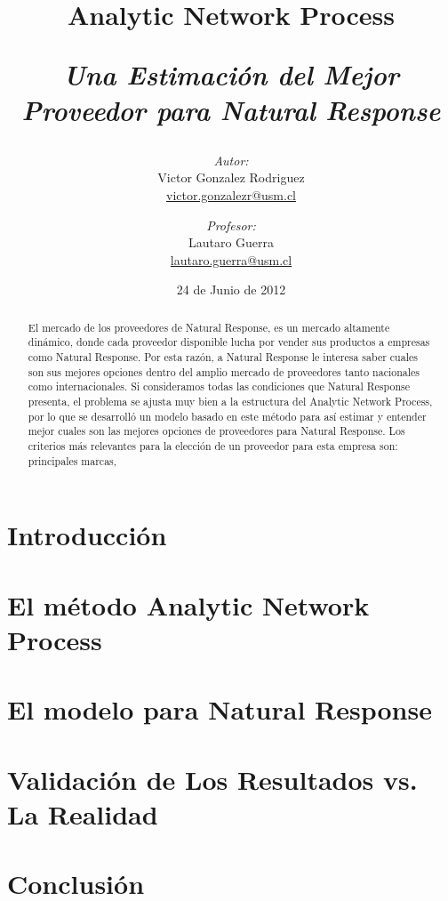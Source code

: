 \documentclass[12pt,letterpaper]{article}
\begin{document}
\title{Analytic Network Process \\ \begin{Large}\it Una Estimación del Mejor Proveedor para Natural Response\end{Large}} 
\author{\emph{Autor:}\\Victor Gonzalez Rodriguez\\\url{victor.gonzalezr@usm.cl} \\
\and \emph{Profesor:}\\Lautaro Guerra\\\url{lautaro.guerra@usm.cl}}
\date{24 de Junio de 2012}


\maketitle

\begin{abstract}
El mercado de los proveedores de Natural Response, es un mercado altamente dinámico, donde cada proveedor disponible lucha por vender sus productos a empresas como Natural Response. Por esta razón, a Natural Response le interesa saber cuales son sus mejores opciones dentro del amplio mercado de proveedores tanto nacionales como internacionales. Si consideramos todas las condiciones que Natural Response presenta, el problema se ajusta muy bien a la estructura del Analytic Network Process, por lo que se desarrolló un modelo basado en este método para así estimar y entender mejor cuales son las mejores opciones de proveedores para Natural Response. Los criterios más relevantes para la elección de un proveedor para esta empresa son: principales marcas, 
\end{abstract}


\section{Introducción}


\section{El método Analytic Network Process}


\section{El modelo para Natural Response}


\section{Validación de Los Resultados vs. La Realidad}

\section{Conclusión}
\end{document}
